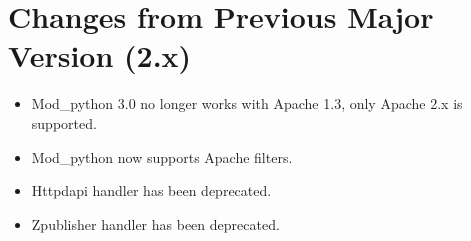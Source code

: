 \chapter{Changes from Previous Major Version (2.x)\label{app-changes}}


\begin{itemize}

\item
Mod_python 3.0 no longer works with Apache 1.3, only Apache 2.x is
supported.
\item 
Mod_python now supports Apache filters.
\item
{} 
Httpdapi handler has been deprecated.
\item
{}
Zpublisher handler has been deprecated.


\end{itemize}
